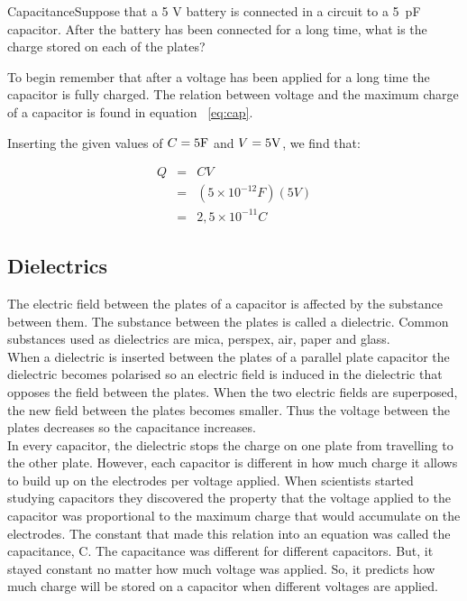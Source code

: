 \begin{wex}{Capacitance}{Suppose that a 5 V battery is connected in a circuit to
a 5~pF capacitor.  After the battery has been connected for a long time, what is
the charge stored on each of the plates?}
{To begin remember that after a voltage has been applied for a
long time the capacitor is fully charged. The relation between
voltage and the maximum charge of a capacitor is found in equation
~\ref{eq:cap}. 

Inserting the given values of $C=5 {\rm F}$ and $V= 5 {\rm V}$, we find that:

\begin{eqnarray*}
Q &=& CV \\
&=& (5\times10^{-12}F)(5V) \\
& = & 2,5\times10^{-11}C
\end{eqnarray*}

}
\end{wex}

\subsection{Dielectrics}
The electric field between the plates of a capacitor is affected by the substance between them. The substance between the plates is called a dielectric. Common substances used as dielectrics are mica, perspex, air, paper and glass.\\
When a dielectric is inserted between the plates of a parallel
plate capacitor the dielectric becomes polarised so an electric
field is induced in the dielectric that opposes the field between
the plates. When the two electric fields are superposed, the new
field between the plates becomes smaller. Thus the voltage between
the plates decreases so the capacitance increases.\\

In every capacitor, the dielectric stops the charge on one plate
from travelling to the other plate.  However, each capacitor is
different in how much charge it allows to build up on the
electrodes per voltage applied.  When scientists started studying
capacitors they discovered the property that the voltage applied
to the capacitor was proportional to the maximum charge that would
accumulate on the electrodes.  The constant that made this
relation into an equation was called the capacitance, C. The
capacitance was different for different capacitors. But, it stayed
constant no matter how much voltage was applied.  So, it predicts
how much charge will be stored on a capacitor when different
voltages are applied.

